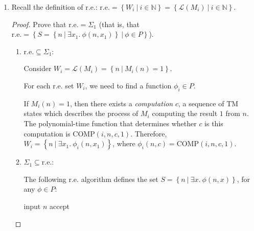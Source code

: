 \documentclass[12pt]{article}
\begin{document}
\noindent{}
\addtocounter{section}{1}

\newcommand{\re}{\text{r.e.}}
\newcommand{\cre}{\text{co-r.e.}}
\newcommand{\nat}{\mathbb{N}}
\newcommand{\lang}{\mathcal{L}}
\newcommand{\setb}[2]{\left\{ #1 ~|~ #2 \right\}}

\begin{enumerate}

  \item Recall the definition of r.e.:
    $\re = \setb{W_i}{i \in \nat} = \setb{\lang(M_i)}{i \in \nat}$.

    \begin{proof}
      Prove that $\re = \Sigma_1$ (that is, that
      $\re = \setb{S = \setb{n}{\exists x_1.~\phi(n, x_1)}}{\phi \in P}$).
      
      \begin{enumerate}
        \item $\re \subseteq \Sigma_1$:

          Consider $W_i = \lang(M_i) = \setb{n}{M_i(n)=1}$.

          For each r.e. set $W_i$, we need to find a function $\phi_i \in P$.

          If $M_i(n) = 1$, then there exists a \emph{computation} $c$, a
          sequence of TM states which describes the process of $M_i$ computing
          the result $1$ from $n$. The polynomial-time function that
          determines whether $c$ is this computation is $\text{COMP}(i,n,c,1)$.
          Therefore, $W_i = \setb{n}{\exists x_1.~\phi_i(n, x_1)}$, where
          $\phi_i(n, c) = \text{COMP}(i, n, c, 1)$.

        \item $\Sigma_1 \subseteq \re$:

          The following r.e. algorithm defines the set
          $S = \setb{n}{\exists x.~\phi(n, x)}$, for any $\phi \in P$:

          \begin{algorithmic}
            \STATE input $n$
                \STATE accept
              \ENDIF
            \ENDFOR
          \end{algorithmic}

      \end{enumerate}
    \end{proof}


\end{enumerate}
\end{document}
